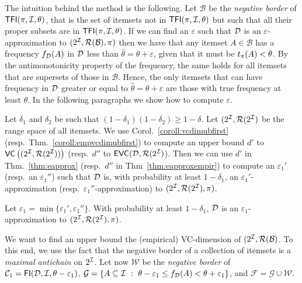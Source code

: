 The intuition behind the method is the following. 
Let $\mathcal{B}$ be
the \emph{negative border} of $\mathsf{TFI}(\pi,{\cal I},\theta)$, that is the set of itemsets
not in $\mathsf{TFI}(\pi,{\cal I},\theta)$ but such that all their proper subsets are in
$\mathsf{TFI}(\pi,{\cal I},\theta)$. If we can find an $\varepsilon$ such that ${\cal D}$ is an
$\varepsilon$-approximation to $(2^{\cal I},\mathcal{R}(\mathcal{B}),\pi)$ then %
we have that any itemset
$A\in\mathcal{B}$ has a frequency $f_{\cal D}(A)$ in ${\cal D}$ less than
$\hat{\theta}=\theta+\varepsilon$, given that it must be $t_\pi(A)<\theta$. By the
antimonotonicity property of the frequency, the same holds for all itemsets that
are supersets of those in $\mathcal{B}$. Hence, the only itemsets that can have
frequency in ${\cal D}$ greater or equal to $\hat{\theta}=\theta+\varepsilon$ are
those with true frequency at least $\theta$. In the following paragraphs we show
how to compute $\varepsilon$.

Let $\delta_1$ and $\delta_2$ be such that $(1-\delta_1)(1-\delta_2)\ge
1-\delta$. Let $(2^{\cal I},\mathcal{R}(2^{\cal I})$ be the range space of all itemsets.
We use Corol.~\ref{coroll:vcdimubfirst} (resp.~Thm.~\ref{coroll:empvcdimubfirst}) to
compute an upper bound $d'$ to $\mathsf{VC}\left((2^{\cal I},\mathcal{R}(2^{\cal I}))\right)$ (resp.~$d''$ to
$\mathsf{EVC}({\cal D},\mathcal{R}(2^{\cal I})$). Then we can use $d'$ in Thm.~\ref{thm:eapprox} (resp.~$d''$ in
Thm~\ref{thm:eapproxempir}) to compute an $\varepsilon_1'$ (resp.~an
$\varepsilon_1''$) such that ${\cal D}$ is, with probability at
least $1-\delta_1$, an $\varepsilon_1'$-approximation
(resp.~$\varepsilon_1''$-approximation) to $(2^{\cal I},\mathcal{R}(2^{\cal I}),\pi)$.
\begin{fact}
Let
$\varepsilon_1=\min\{\varepsilon_1',\varepsilon_1''\}$. %
With probability at least $1-\delta_1$, ${\cal D}$ is an
$\varepsilon_1$-approximation to $(2^{\cal I},\mathcal{R}(2^{\cal I}),\pi)$.
\end{fact}

We want to find an upper bound the (empirical) VC-dimension of
$(2^{\cal I},\mathcal{R}(\mathcal{B})$. To this end, we use the fact that the negative border of a
collection of itemsets is a \emph{maximal
antichain} on $2^{\cal I}$. %
Let now $\mathcal{W}$ be the \emph{negative
border} of $\mathcal{C}_1=\mathsf{FI}({\cal D},{\cal I},\theta-\varepsilon_1)$, 
$\mathcal{G}=\{A\subseteq{\cal I} ~:~ \theta-\varepsilon_1\le
f_{\cal D}(A)<\theta+\varepsilon_1\}$, and $\mathcal{F}=\mathcal{G}\cup\mathcal{W}$.

